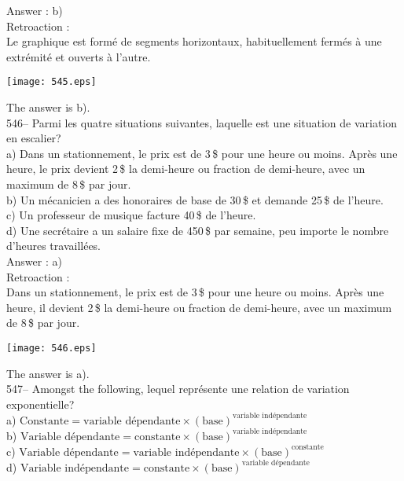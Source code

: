 ﻿\documentclass[letterpaper, 12pt]{article}
\begin{document}
Answer : b)\\

Retroaction : \\
Le graphique est form\'e de segments horizontaux, habituellement ferm\'es
\`a une extr\'emit\'e et ouverts \`a l'autre.
   \begin{center}
    \texttt{[image: 545.eps]}
    \end{center}
The answer is b).\\

546-- Parmi les quatre situations suivantes, laquelle est une situation de
variation en escalier?\\
a) Dans un stationnement, le prix est de 3\,\$ pour une heure ou moins.
Apr\`es une heure, le prix devient 2\,\$ la demi-heure ou fraction de
demi-heure, avec un maximum de 8\,\$ par jour.  \\
b) Un m\'ecanicien a des honoraires de base de 30\,\$ et demande 25\,\$ de
l'heure.\\
c) Un professeur de musique facture 40\,\$ de l'heure.\\
d) Une secr\'etaire a un salaire fixe de 450\,\$ par semaine, peu importe le
nombre d'heures travaill\'ees.\\

Answer : a) \\

Retroaction : \\
Dans un stationnement, le prix est de 3\,\$ pour une heure ou moins.
Apr\`es une heure, il devient 2\,\$ la demi-heure ou fraction de demi-heure,
avec un maximum de 8\,\$ par jour.
   \begin{center}
    \texttt{[image: 546.eps]}
    \end{center}
The answer is a).\\

547-- Amongst the following, lequel repr\'esente une relation de
variation exponentielle?\\[2mm]
a) $\textrm{Constante}=\textrm{variable
d\'ependante}\times\left(\textrm{base}\right) ^{\textrm{variable
ind\'ependante}}$\\[2mm]
b) $\textrm{Variable
d\'ependante}=\textrm{constante}\times\left(\textrm{base}\right)
^{\textrm{variable ind\'ependante}}$\\[2mm]
c) $\textrm{Variable
d\'ependante}=\textrm{variable
ind\'ependante}\times\left(\textrm{base}\right)
^{\textrm{constante}}$\\ [2mm]
d) $\textrm{Variable
ind\'ependante}=\textrm{constante}\times\left(\textrm{base}\right)
^{\textrm{variable d\'ependante}}$\\
\end{document}
